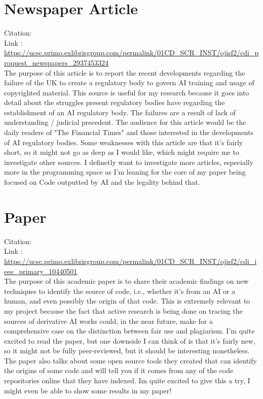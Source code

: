 \documentclass{article}
\begin{document}
\section{Newspaper Article}

Citation: \cite{thomas2024}
\\
Link : \url{https://ucsc.primo.exlibrisgroup.com/permalink/01CD_SCR_INST/ojisf2/cdi_proquest_newspapers_2937453324}
\\

The purpose of this article is to report the recent developments regarding
the failure of the UK to create a regulatory body to govern AI training
and usage of copyrighted material. This source is useful for my research
because it goes into detail about the struggles present regulatory bodies
have regarding the establishment of an AI regulatory body. The failures are a result
of lack of understanding / judicial precedent. The audience for
this article would be the daily readers of "The Financial Times" and those
interested in the developments of AI regulatory bodies. Some weaknesses with
this article are that it's fairly short, so it might not go as deep as I
would like, which might require me to investigate other sources. I definetly want to
investigate more articles, especially more in the programming space as I'm leaning
for the core of my paper being focused on Code outputted by AI and the legality behind that.

\section{Paper}

Citation: \cite{ma2024}
\\
Link : \url{https://ucsc.primo.exlibrisgroup.com/permalink/01CD_SCR_INST/ojisf2/cdi_ieee_primary_10440501}
\\

The purpose of this academic paper is to share their academic findings on
new techniques to identify the source of code, i.e., whether it's from an
AI or a human, and even possibly the origin of that code. This is extremely
relevant to my project because the fact that active research is being done
on tracing the sources of derivative AI works could, in the near future,
make for a comprehensive case on the distinction between fair use and
plagiarism. I'm quite excited to read the paper, but one downside I can
think of is that it's fairly new, so it might not be fully peer-reviewed,
but it should be interesting nonetheless. The paper also talks about some
open source tools they created that can identify the origins of some
code and will tell you if it comes from any of the code repositories online
that they have indexed. Im quite excited to give this a try, I might even be
able to show some results in my paper!
\end{document}
